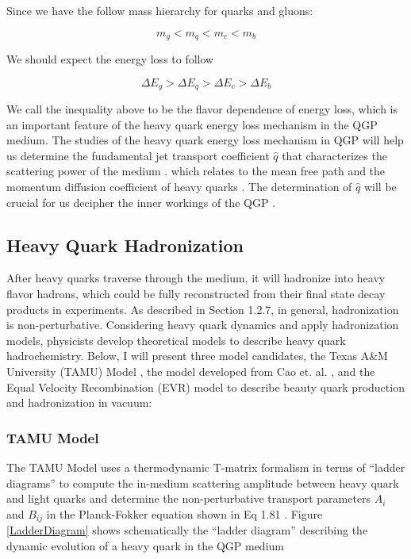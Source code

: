 Since we have the follow mass hierarchy for quarks and gluons:

\begin{equation}
m_g < m_q < m_c < m_b
\end{equation}

We should expect the energy loss to follow

\begin{equation}
\Delta E_g > \Delta E_q > \Delta E_c >  \Delta E_b
\end{equation}

We call the inequality above to be the flavor dependence of energy loss, which is an important feature of the heavy quark energy loss mechanism in the QGP medium. The studies of the heavy quark energy loss mechanism in QGP will help us determine the fundamental jet transport coefficient $\hat q$ that characterizes the scattering power of the medium \cite{HQReview}. which relates to the mean free path and the momentum diffusion coefficient of heavy quarks \cite{qhatStudy}. The determination of $\hat q$ will be crucial for us decipher the inner workings of the QGP \cite{JetTransProbe}.

\subsection{Heavy Quark Hadronization}

After heavy quarks traverse through the medium, it will hadronize into heavy flavor hadrons, which could be fully reconstructed from their final state decay products in experiments. As described in Section 1.2.7, in general, hadronization is non-perturbative. Considering heavy quark dynamics and apply hadronization models, physicists develop theoretical models to describe heavy quark hadrochemistry. Below, I will present three model candidates, the Texas A\&M University (TAMU) Model \cite{TAMUModel}, the model developed from Cao et. al. \cite{CaoSunKo}, and the Equal Velocity Recombination (EVR) model \cite{EVR} to describe beauty quark production and hadronization in vacuum:


\subsubsection{TAMU Model}

The TAMU Model uses a thermodynamic T-matrix formalism in terms of ``ladder diagrams'' to compute the in-medium scattering amplitude between heavy quark and light quarks and determine the non-perturbative transport parameters $A_i$ and $B_{ij}$ in the Planck-Fokker equation shown in Eq 1.81 \cite{TAMUModel}. Figure \ref{LadderDiagram} shows schematically the ``ladder diagram'' describing the dynamic evolution of a heavy quark in the QGP medium 

